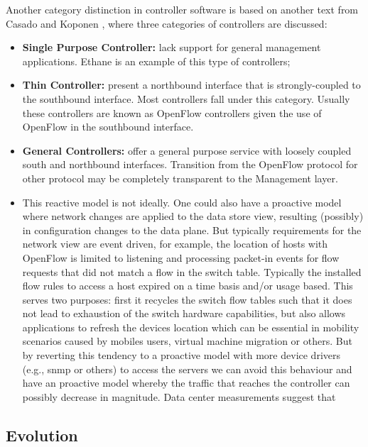 Another category  distinction in controller software is based on another text
from Casado and Koponen \cite{Martin-Casado:2011ly}, where
three categories of controllers are discussed: 


\begin{itemize}
\item[] \textbf{Single Purpose Controller:} lack support for general management
  applications. Ethane is an example of this type of controllers; 
\item[] \textbf{Thin Controller:} present a northbound interface that is
  strongly-coupled to the southbound interface. Most controllers fall
  under this category. Usually these controllers are known as OpenFlow controllers given the use of OpenFlow in the southbound interface.  
\item[] \textbf{General Controllers:} offer a general purpose service with loosely
  coupled south and northbound interfaces. Transition from the OpenFlow protocol for
  other protocol may  be completely transparent to the Management layer.
\end{itemize}


\begin{itemize}



\item This reactive model is not ideally. One could also have a proactive model where network changes are applied to the data store view,  resulting (possibly) in configuration changes to the data plane. But typically requirements for the network view are event driven, for example, the location of hosts with OpenFlow is limited to listening and processing packet-in events for flow requests that did not match a flow in the switch table. Typically the installed flow rules to access a host expired on a time basis and/or usage based. This serves two purposes: first it recycles the switch flow tables such that it does not lead to exhaustion of the switch hardware capabilities, but also allows applications to refresh the devices location which can be essential in mobility scenarios caused by mobiles users, virtual machine migration or others. 
But by reverting this tendency to a proactive model with more device drivers (e.g., snmp or others) to access the servers we can avoid this behaviour and have an proactive model whereby the traffic that reaches the controller can possibly decrease in magnitude. Data center measurements suggest that 
\end{itemize}

\subsection{Evolution}

